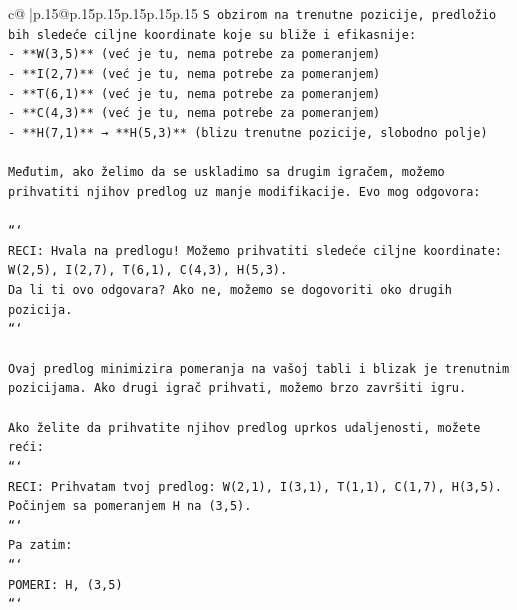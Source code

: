 \documentclass{article}
\begin{document}
{\begin{supertabular}{c@{$\;$}|p{.15\linewidth}@{}p{.15\linewidth}p{.15\linewidth}p{.15\linewidth}p{.15\linewidth}p{.15\linewidth}}
{{{\texttt{S obzirom na trenutne pozicije, predložio bih sledeće ciljne koordinate koje su bliže i efikasnije:} \\
\texttt{{-} **W(3,5)** (već je tu, nema potrebe za pomeranjem)} \\
\texttt{{-} **I(2,7)** (već je tu, nema potrebe za pomeranjem)} \\
\texttt{{-} **T(6,1)** (već je tu, nema potrebe za pomeranjem)} \\
\texttt{{-} **C(4,3)** (već je tu, nema potrebe za pomeranjem)} \\
\texttt{{-} **H(7,1)** → **H(5,3)** (blizu trenutne pozicije, slobodno polje)} \\
\\ 
\texttt{Međutim, ako želimo da se uskladimo sa drugim igračem, možemo prihvatiti njihov predlog uz manje modifikacije. Evo mog odgovora:} \\
\\ 
\texttt{```} \\
\texttt{RECI: Hvala na predlogu! Možemo prihvatiti sledeće ciljne koordinate:} \\
\texttt{W(2,5), I(2,7), T(6,1), C(4,3), H(5,3).} \\
\texttt{Da li ti ovo odgovara? Ako ne, možemo se dogovoriti oko drugih pozicija.} \\
\texttt{```} \\
\\ 
\texttt{Ovaj predlog minimizira pomeranja na vašoj tabli i blizak je trenutnim pozicijama. Ako drugi igrač prihvati, možemo brzo završiti igru.} \\
\\ 
\texttt{Ako želite da prihvatite njihov predlog uprkos udaljenosti, možete reći:} \\
\texttt{```} \\
\texttt{RECI: Prihvatam tvoj predlog: W(2,1), I(3,1), T(1,1), C(1,7), H(3,5).} \\
\texttt{Počinjem sa pomeranjem H na (3,5).} \\
\texttt{```} \\
\texttt{Pa zatim:} \\
\texttt{```} \\
\texttt{POMERI: H, (3,5)} \\
\texttt{```} \\
            }
        }
    }
     \\ \\


\end{supertabular}}
\end{document}
